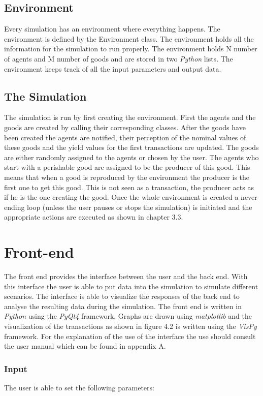 \documentclass[twoside,openright]{uva-bachelor-thesis}
\begin{document}
\subsection{Environment}
Every simulation has an environment where everything happens. The environment is defined by the Environment class. The environment holds all the information for the simulation to run properly. The environment holds N number of agents and M number of goods and are stored in two \textit{Python} lists. The environment keeps track of all the input parameters and output data.

\subsection{The Simulation}
The simulation is run by first creating the environment. First the agents and the goods are created by calling their corresponding classes. After the goods have been created the agents are notified, their perception of the nominal values of these goods and the yield values for the first transactions are updated. The goods are either randomly assigned to the agents or chosen by the user. The agents who start with a perishable good are assigned to be the producer of this good. This means that when a good is reproduced by the environment the producer is the first one to get this good. This is not seen as a transaction, the producer acts as if he is the one creating the good. Once the whole environment is created a never ending loop (unless the user pauses or stops the simulation) is initiated and the appropriate actions are executed as shown in chapter 3.3.


\section{Front-end}
The front end provides the interface between the user and the back end. With this interface the user is able to put data into the simulation to simulate different scenarios. The interface is able to visualize the responses of the back end to analyse the resulting data during the simulation. The front end is written in \textit{Python} using the \textit{PyQt4} framework. Graphs are drawn using \textit{matplotlib} and the visualization of the transactions as shown in figure 4.2 is written using the \textit{VisPy} framework. For the explanation of the use of the interface the use should consult the user manual which can be found in appendix A.

\subsubsection{Input}
The user is able to set the following parameters:
\end{document}
